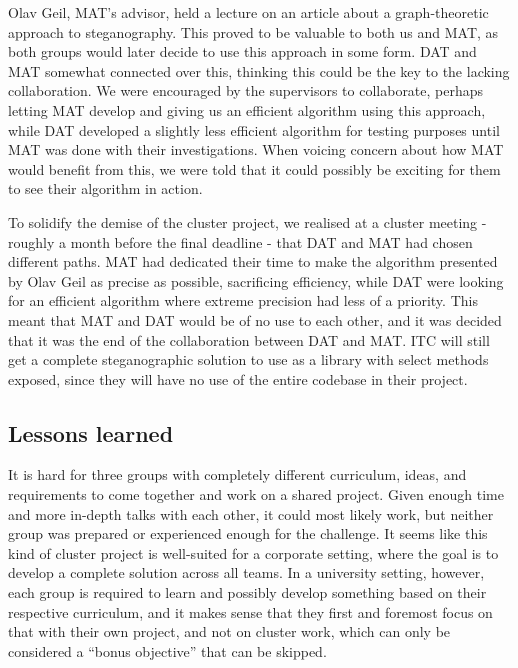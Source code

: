 Olav Geil, MAT's advisor, held a lecture on an article about a graph-theoretic approach to steganography\citep{hetzl_2005}.
This proved to be valuable to both us and MAT, as both groups would later decide to use this approach in some form.
DAT and MAT somewhat connected over this, thinking this could be the key to the lacking collaboration.
We were encouraged by the supervisors to collaborate, perhaps letting MAT develop and giving us an efficient algorithm using this approach, while DAT developed a slightly less efficient algorithm for testing purposes until MAT was done with their investigations.
When voicing concern about how MAT would benefit from this, we were told that it could possibly be exciting for them to see their algorithm in action.

To solidify the demise of the cluster project, we realised at a cluster meeting - roughly a month before the final deadline - that DAT and MAT had chosen different paths.
MAT had dedicated their time to make the algorithm presented by Olav Geil as precise as possible, sacrificing efficiency, while DAT were looking for an efficient algorithm where extreme precision had less of a priority.
This meant that MAT and DAT would be of no use to each other, and it was decided that it was the end of the collaboration between DAT and MAT.
ITC will still get a complete steganographic solution to use as a library with select methods exposed, since they will have no use of the entire codebase in their project.

\subsection*{Lessons learned}
It is hard for three groups with completely different curriculum, ideas, and requirements to come together and work on a shared project.
Given enough time and more in-depth talks with each other, it could most likely work, but neither group was prepared or experienced enough for the challenge.
It seems like this kind of cluster project is well-suited for a corporate setting, where the goal is to develop a complete solution across all teams.
In a university setting, however, each group is required to learn and possibly develop something based on their respective curriculum, and it makes sense that they first and foremost focus on that with their own project, and not on cluster work, which can only be considered a ``bonus objective'' that can be skipped.

